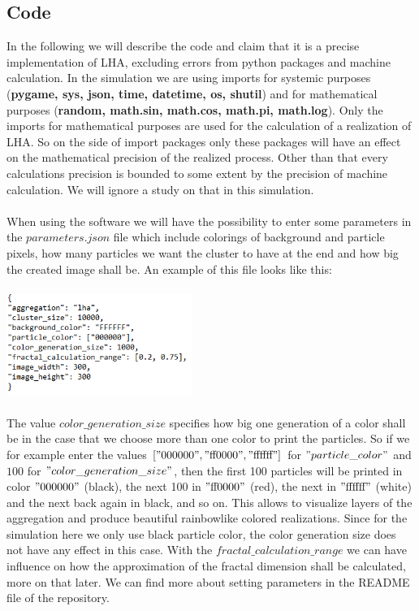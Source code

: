 \documentclass[12pt,a4paper]{scrartcl}
\newcommand{\1}{\mathbbm{1}}
\theoremstyle{definition}
\numberwithin{equation}{section}
\begin{document}
\subsection{Code}
In the following we will describe the code and claim that it is a precise implementation of LHA, excluding errors from python packages and machine calculation. In the simulation we are using imports for systemic purposes (\textbf{pygame, sys, json, time, datetime, os, shutil}) and for mathematical purposes (\textbf{random, math.sin, math.cos, math.pi, math.log}). Only the imports for mathematical purposes are used for the calculation of a realization of LHA. So on the side of import packages only these packages will have an effect on the mathematical precision of the realized process. Other than that every calculations precision is bounded to some extent by the precision of machine calculation. We will ignore a study on that in this simulation. \\
\\When using the software we will have the possibility to enter some parameters in the $\mathit{parameters.json}$ file which include colorings of background and particle pixels, how many particles we want the cluster to have at the end and how big the created image shall be. An example of this file looks like this:\\
\\
\includegraphics[height=3.33cm]{images/code-snippets/parameters.png} \\
\\
The value $\mathit{color\_generation\_size}$ specifies how big one generation of a color shall be in the case that we choose more than one color to print the particles. So if we for example enter the values $["000000","\text{ff0000}","\text{ffffff}"]$ for $"particle\_color"$ and $100$ for $"color\_generation\_size"$, then the first 100 particles will be printed in color $"000000"$ (black), the next 100 in $"\text{ff}0000"$ (red), the next in $"\text{ffffff}"$ (white) and the next back again in black, and so on. This allows to visualize layers of the aggregation and produce beautiful rainbowlike colored realizations. Since for the simulation here we only use black particle color, the color generation size does not have any effect in this case. With the $\mathit{fractal\_calculation\_range}$ we can have influence on how the approximation of the fractal dimension shall be calculated, more on that later. We can find more about setting parameters in the README file of the repository. \\
\end{document}
